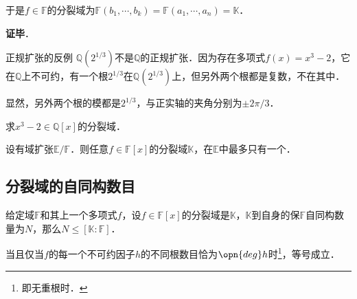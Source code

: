 于是$f\in\mathbb{F}$的分裂域为$\mathbb{F}(b_1, \cdots, b_k)=\mathbb{F}(a_1, \cdots, a_n)=\mathbb{K}$．

\textbf{证毕}．








\begin{example}{正规扩张的反例}
$\mathbb{Q}(2^{1/3})$不是$\mathbb{Q}$的正规扩张．因为存在多项式$f(x)=x^3-2$，它在$\mathbb{Q}$上不可约，有一个根$2^{1/3}$在$\mathbb{Q}(2^{1/3})$上，但另外两个根都是复数，不在其中．

显然，另外两个根的模都是$2^{1/3}$，与正实轴的夹角分别为$\pm 2\pi/3$．
\end{example}

\begin{exercise}{}
求$x^3-2\in\mathbb{Q}[x]$的分裂域．
\end{exercise}



\begin{corollary}{}
设有域扩张$\mathbb{E}/\mathbb{F}$．则任意$f\in\mathbb{F}[x]$的分裂域$\mathbb{K}$，在$\mathbb{E}$中最多只有一个．
\end{corollary}









\subsection{分裂域的自同构数目}




\begin{theorem}{}\label{SpltFd_the1}
给定域$\mathbb{F}$和其上一个多项式$f$，设$f\in\mathbb{F}[x]$的分裂域是$\mathbb{K}$，$\mathbb{K}$到自身的保$\mathbb{F}$自同构数量为$N$，那么$N\leq[\mathbb{K}:\mathbb{F}]$．

当且仅当$f$的每一个不可约因子$h$的不同根数目恰为$\opn{deg}h$时\footnote{即无重根时．}，等号成立．
\end{theorem}

